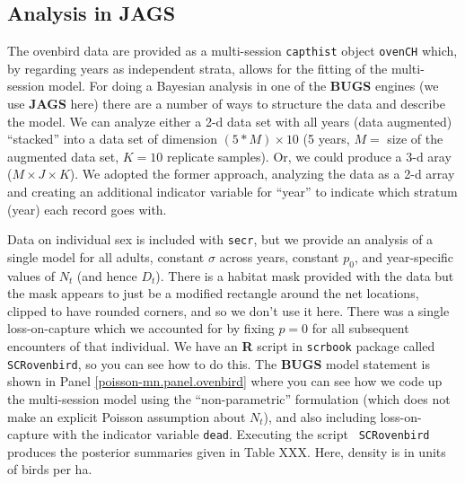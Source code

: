 \subsection{Analysis in JAGS}

The ovenbird data are provided as a multi-session \mbox{\tt capthist}
object \mbox{\tt ovenCH} which, by regarding  years as independent
strata, allows for the fitting of the multi-session model.
For doing a Bayesian analysis in one of the {\bf BUGS} engines (we use
{\bf JAGS} here) there are a number of ways to structure the data and
describe the model. 
We can analyze either a 2-d data set with all years
(data augmented) ``stacked'' into a data set of dimension $(5*M)
\times 10$
(5 years, $M=$ size of the augmented data set, $K=10$ replicate samples). Or, we could 
produce a 3-d aray ($M \times J \times K$). We adopted the former
approach, analyzing the 
data as a 2-d array  and creating an additional indicator variable for
``year'' to indicate which stratum (year) each record goes with. 

Data on individual sex is included
with \mbox{\tt secr}, but  we provide an analysis of a single model
for all adults, constant $\sigma$ across years, constant $p_{0}$, and
year-specific values of $N_{t}$ (and hence $D_{t}$). 
 There is a habitat mask provided with the data but the mask
appears to just be a modified rectangle around the net locations,
clipped to have rounded corners, and so we don't use it here.  There
was a single loss-on-capture which we accounted for 
by fixing  $p=0$ for all subsequent encounters
of that individual. 
 We have an {\bf R} script in \mbox{\tt scrbook}
package called \mbox{\tt SCRovenbird}, so you can see how to do
this. The {\bf BUGS} model statement is shown in Panel 
\ref{poisson-mn.panel.ovenbird}
where you
can see how we code up the multi-session model using the
``non-parametric'' formulation (which does not make an explicit
Poisson assumption about $N_{t}$), and also including loss-on-capture
with the indicator variable \mbox{\tt dead}. Executing the script \mbox{\tt
  SCRovenbird} produces the posterior summaries  given in Table
XXX. Here, density is in units of birds per ha. 


